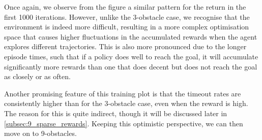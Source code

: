 Once again, we observe from the figure a similar pattern for the return in the first 1000 iterations. However, unlike the 3-obstacle case, we recognise that the environment is indeed more difficult, resulting in a more complex optimisation space that causes higher fluctuations in the accumulated rewards when the agent explores different trajectories. This is also more pronounced due to the longer episode times, such that if a policy does well to reach the goal, it will accumulate significantly more rewards than one that does decent but does not reach the goal as closely or as often.

Another promising feature of this training plot is that the timeout rates are consistently higher than for the 3-obstacle case, even when the reward is high. The reason for this is quite indirect, though it will be discussed later in \cref{subsec:9_sparse_rewards}.
Keeping this optimistic perspective, we can then move on to 9-obstacles.


